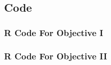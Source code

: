 \documentclass[american,]{article}
\begin{document}
\hypertarget{code}{%
\subsection{Code}\label{code}}

\hypertarget{r-code-for-objective-i}{%
\subsubsection{R Code For Objective I}\label{r-code-for-objective-i}}

\newpage

\hypertarget{r-code-for-objective-ii}{%
\subsubsection{R Code For Objective II}\label{r-code-for-objective-ii}}
\end{document}
